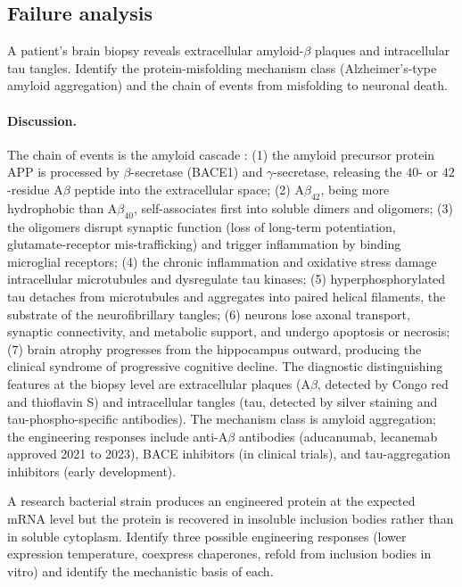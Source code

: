 \subsection*{Failure analysis}

\begin{exercise}
A patient's brain biopsy reveals extracellular amyloid-$\beta$
plaques and intracellular tau tangles. Identify the protein-misfolding
mechanism class (Alzheimer's-type amyloid aggregation) and the
chain of events from misfolding to neuronal death.
\end{exercise}

\paragraph{Discussion.}
The chain of events is the amyloid cascade
\cite{paper:v6c04-hardy-higgins-1992,paper:v6c04-walsh-selkoe-2007}:
(1) the amyloid precursor protein APP is processed by
$\beta$-secretase (BACE1) and $\gamma$-secretase, releasing the
$40$- or $42$-residue A$\beta$ peptide into the extracellular
space; (2) A$\beta_{42}$, being more hydrophobic than A$\beta_{40}$,
self-associates first into soluble dimers and oligomers; (3) the
oligomers disrupt synaptic function (loss of long-term potentiation,
glutamate-receptor mis-trafficking) and trigger inflammation by
binding microglial receptors; (4) the chronic inflammation and
oxidative stress damage intracellular microtubules and dysregulate
tau kinases; (5) hyperphosphorylated tau detaches from microtubules
and aggregates into paired helical filaments, the substrate of the
neurofibrillary tangles; (6) neurons lose axonal transport,
synaptic connectivity, and metabolic support, and undergo apoptosis
or necrosis; (7) brain atrophy progresses from the hippocampus
outward, producing the clinical syndrome of progressive cognitive
decline. The diagnostic distinguishing features at the biopsy level
are extracellular plaques (A$\beta$, detected by Congo red and
thioflavin S) and intracellular tangles (tau, detected by
silver staining and tau-phospho-specific antibodies). The mechanism
class is amyloid aggregation; the engineering responses include
anti-A$\beta$ antibodies (aducanumab, lecanemab approved 2021 to
2023), BACE inhibitors (in clinical trials), and tau-aggregation
inhibitors (early development).

\begin{exercise}
A research bacterial strain produces an engineered protein at the
expected mRNA level but the protein is recovered in insoluble
inclusion bodies rather than in soluble cytoplasm. Identify three
possible engineering responses (lower expression temperature, coexpress
chaperones, refold from inclusion bodies in vitro) and identify the
mechanistic basis of each.
\end{exercise}

